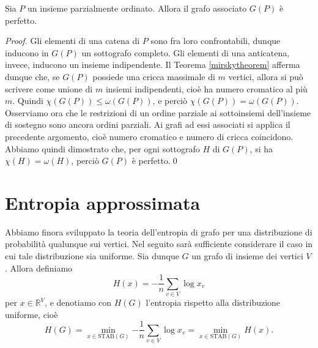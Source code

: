 \begin{corollary}
  Sia \(P\) un insieme parzialmente ordinato. Allora il grafo associato \(G(P)\) è perfetto.
\end{corollary}
\begin{proof}
  Gli elementi di una catena di \(P\) sono fra loro confrontabili, dunque inducono in \(G(P)\) un sottografo completo. Gli elementi di una anticatena, invece, inducono un insieme indipendente. Il Teorema \ref{mirskytheorem} afferma dunque che, se \(G(P)\) possiede una cricca massimale di \(m\) vertici, allora si può scrivere come unione di \(m\) insiemi indipendenti, cioè ha numero cromatico al più \(m\). Quindi \(\chi(G(P))\le \omega(G(P))\), e perciò \(\chi(G(P))=\omega(G(P))\). Osserviamo ora che le restrizioni di un ordine parziale ai sottoinsiemi dell'insieme di sostegno sono ancora ordini parziali. Ai grafi ad essi associati si applica il precedente argomento, cioè numero cromatico e numero di cricca coincidono. Abbiamo quindi dimostrato che, per ogni sottografo \(H\) di \(G(P)\), si ha \(\chi(H)=\omega(H)\), perciò \(G(P)\) è perfetto.\qed
\end{proof}

\section{Entropia approssimata}

Abbiamo finora sviluppato la teoria dell'entropia di grafo per una distribuzione di probabilità qualunque sui vertici. Nel seguito sarà sufficiente considerare il caso in cui tale distribuzione sia uniforme. Sia dunque \(G\) un grafo di insieme dei vertici \(V\). Allora definiamo
\[
H(x) = -\frac{1}{n}\sum_{v\in V}{\log{x_v}}
\]
per \(x\in\mathbb{R}^V\), e denotiamo con \(H(G)\) l'entropia rispetto alla distribuzione uniforme, cioè
\[
H(G) = \min_{x\in \text{STAB}(G)}{-\frac{1}{n}\sum_{v\in V}{\log{x_v}}} = \min_{x\in \text{STAB}(G)}{H(x)}\text{.}
\]

